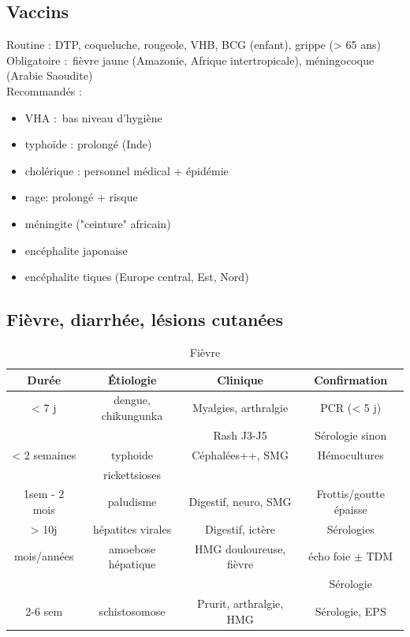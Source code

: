 \documentclass{article}
\begin{document}
\subsection{Vaccins}%
Routine : DTP, coqueluche, rougeole, VHB, BCG (enfant), grippe (> 65 ans)\\
Obligatoire : fièvre jaune (Amazonie, Afrique intertropicale), méningocoque
(Arabie Saoudite)\\
Recommandés :
\begin{itemize}
  \item VHA : bas niveau d'hygiène
  \item typhoïde : prolongé (Inde)
  \item cholérique : personnel médical + épidémie
  \item rage: prolongé + risque
  \item méningite ("ceinture" africain)
  \item encéphalite japonaise
  \item encéphalite tiques (Europe central, Est, Nord)
\end{itemize}

\subsection{Fièvre, diarrhée, lésions cutanées}
\begin{table}[htpb]
  \centering
  \caption{Fièvre}
  \begin{tabular}{*{4}{c}}
  \toprule
  Durée        & Étiologie           & Clinique                & Confirmation \\
  \midrule
  < 7 j        & dengue, chikungunka & Myalgies, arthralgie    & PCR (< 5 j)\\
               &                     & Rash J3-J5              & Sérologie sinon\\
  \midrule
  < 2 semaines & typhoide            & Céphalées++, SMG        & Hémocultures\\
               & rickettsioses       & &\\
  \midrule
  1sem - 2 mois& paludisme          & Digestif, neuro, SMG     & Frottis/goutte épaisse\\
  > 10j        & hépatites virales  & Digestif, ictère        & Sérologies \\
  mois/années  & amoebose hépatique & HMG douloureuse, fièvre & écho foie $\pm$ TDM\\
               &                    &                         & Sérologie\\
  2-6 sem      & schistosomose      & Prurit, arthralgie, HMG & Sérologie, EPS\\
  \bottomrule
  \end{tabular}
\end{table}
\end{document}
